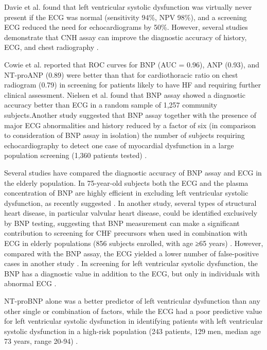 \documentclass[14pt,a4paper,onecolumn]{extarticle}
\begin{document}
Davie et al. \citep{bib3169} found that left ventricular systolic dysfunction was virtually never present if the ECG was normal (sensitivity 94\%, NPV 98\%), and a screening ECG reduced the
need for echocardiograms by 50\%. However, several studies demonstrate that CNH assay
can improve the diagnostic accuracy of history, ECG, and chest radiography \citep{bib3167} \citep{bib3168} \citep{bib3169} \citep{bib3170} \citep{bib3171} \citep{bib3172} \citep{bib3173} \citep{bib3174}.

Cowie et al. \citep{bib3110} reported that ROC curves for BNP (AUC = 0.96), ANP (0.93), and
NT-proANP (0.89) were better than that for cardiothoracic ratio on chest radiogram
(0.79) in screening for patients likely to have HF and requiring further clinical assessment. Nielsen et al. \citep{bib392} found that BNP assay showed a diagnostic accuracy better than
ECG in a random sample of 1,257 community subjects.Another study suggested that BNP
assay together with the presence of major ECG abnormalities and history reduced by
a factor of six (in comparison to consideration of BNP assay in isolation) the number
of subjects requiring echocardiography to detect one case of myocardial dysfunction in
a large population screening (1,360 patients tested) \citep{bib3171}.

Several studies have compared the diagnostic accuracy of BNP assay and ECG in
the elderly population. In 75-year-old subjects both the ECG and the plasma concentration
of BNP are highly efficient in excluding left ventricular systolic dysfunction, as recently suggested \citep{bib3173}. In another study, several types of structural heart disease, in particular
valvular heart disease, could be identified exclusively by BNP testing, suggesting that BNP
measurement can make a significant contribution to screening for CHF precursors
when used in combination with ECG in elderly populations (856 subjects enrolled, with
age ≥65 years) \citep{bib3174}. However, compared with the BNP assay, the ECG yielded a lower
number of false-positive cases in another study \citep{bib3172}. In screening for left ventricular
systolic dysfunction, the BNP has a diagnostic value in addition to the ECG, but only in
individuals with abnormal ECG \citep{bib3172}.

NT-proBNP alone was a better predictor of left ventricular dysfunction than any
other single or combination of factors, while the ECG had a poor predictive value for left
ventricular systolic dysfunction in identifying patients with left ventricular systolic
dysfunction in a high-risk population (243 patients, 129 men, median age 73 years,
range 20-94) \citep{bib3173}.
\end{document}
